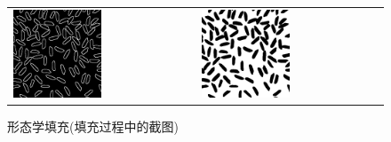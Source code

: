 \documentclass[a4paper]{ctexart}
\begin{document}
\begin{figure}[H]
    \begin{tabular}{p{}p{}}
    \centering
      \includegraphics*[width=0.5\textwidth]{fig/mor_edge.png}
      \caption{形态学边缘}
      &
      \centering
      \includegraphics*[width=0.5\textwidth]{fig/fill.png}
      \caption{形态学填充(填充过程中的截图)}
    \end{tabular}


\end{figure}
\end{document}
